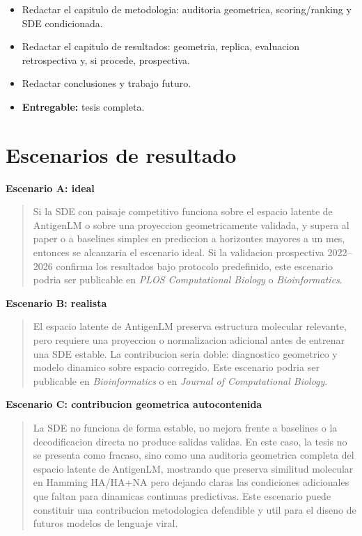 \documentclass[12pt,letterpaper]{article}
\newenvironment{escenario}[1]{%
    \vspace{0.5em}
    \noindent\textbf{#1}\par\smallskip
    \begin{quote}
}{%
    \end{quote}
}
\begin{document}
\begin{itemize}[leftmargin=2em]
    \item Redactar el capitulo de metodologia: auditoria geometrica, scoring/ranking y SDE condicionada.
    \item Redactar el capitulo de resultados: geometria, replica, evaluacion retrospectiva y, si procede, prospectiva.
    \item Redactar conclusiones y trabajo futuro.
    \item \textbf{Entregable:} tesis completa.
\end{itemize}

\section{Escenarios de resultado}

\begin{escenario}{Escenario A: ideal}
Si la SDE con paisaje competitivo funciona sobre el espacio latente de AntigenLM o sobre una proyeccion geometricamente validada, y supera al paper o a baselines simples en prediccion a horizontes mayores a un mes, entonces se alcanzaria el escenario ideal. Si la validacion prospectiva 2022--2026 confirma los resultados bajo protocolo predefinido, este escenario podria ser publicable en \emph{PLOS Computational Biology} o \emph{Bioinformatics}.
\end{escenario}

\begin{escenario}{Escenario B: realista}
El espacio latente de AntigenLM preserva estructura molecular relevante, pero requiere una proyeccion o normalizacion adicional antes de entrenar una SDE estable. La contribucion seria doble: diagnostico geometrico y modelo dinamico sobre espacio corregido. Este escenario podria ser publicable en \emph{Bioinformatics} o en \emph{Journal of Computational Biology}.
\end{escenario}

\begin{escenario}{Escenario C: contribucion geometrica autocontenida}
La SDE no funciona de forma estable, no mejora frente a baselines o la decodificacion directa no produce salidas validas. En este caso, la tesis no se presenta como fracaso, sino como una auditoria geometrica completa del espacio latente de AntigenLM, mostrando que preserva similitud molecular en Hamming HA/HA+NA pero dejando claras las condiciones adicionales que faltan para dinamicas continuas predictivas. Este escenario puede constituir una contribucion metodologica defendible y util para el diseno de futuros modelos de lenguaje viral.
\end{escenario}
\end{document}
